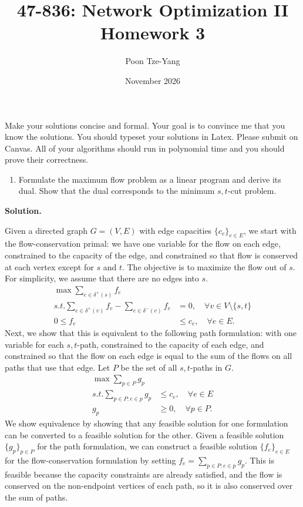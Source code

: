 \documentclass[11pt,letterpaper]{article}
\title{47-836: Network Optimization II \\ Homework 3}
\author{Poon Tze-Yang}
\date{November 2026}
\theoremstyle{definition}
\newcommand{\solution}{\medskip\noindent\textbf{Solution.}\par\medskip}
\begin{document}
\maketitle

Make your solutions concise and formal. Your goal is to convince me that you know the solutions. You should typeset your solutions in Latex. Please submit on Canvas. All of your algorithms should run in polynomial time and you should prove their correctness.

\begin{enumerate}[series=q]
\item Formulate the maximum flow problem as a linear program and derive its dual. Show that the dual corresponds to the minimum $s,t$-cut problem.
\end{enumerate}

\solution

Given a directed graph $G=(V,E)$ with edge capacities $\{c_e\}_{e \in E}$, we start with the flow-conservation primal: we have one variable for the flow on each edge, constrained to the capacity of the edge, and constrained so that flow is conserved at each vertex except for $s$ and $t$.
The objective is to maximize the flow out of $s$.
For simplicity, we assume that there are no edges into $s$.
\begin{align*}
    \max \sum_{e\in \delta^+(s)} f_e \\
    s.t. \sum_{e\in\delta^+(v)} f_e - \sum_{e\in\delta^-(v)} f_e &= 0,\quad \forall v \in V\setminus\{s,t\} \\
    0 \leq f_e &\leq c_e,\quad \forall e \in E.
\end{align*}
Next, we show that this is equivalent to the following path formulation: with one variable for each $s,t$-path, constrained to the capacity of each edge, and constrained so that the flow on each edge is equal to the sum of the flows on all paths that use that edge.
Let $P$ be the set of all $s,t$-paths in $G$.
\begin{align*}
    \max \sum_{p\in P} g_p \\
    s.t. \sum_{p\in P: e\in p} g_p &\leq c_e,\quad \forall e \in E \\
    g_p &\geq 0,\quad \forall p \in P.
\end{align*}
We show equivalence by showing that any feasible solution for one formulation can be converted to a feasible solution for the other.
Given a feasible solution $\{g_p\}_{p\in P}$ for the path formulation, we can construct a feasible solution $\{f_e\}_{e\in E}$ for the flow-conservation formulation by setting $f_e = \sum_{p\in P: e\in p} g_p$.
This is feasible because the capacity constraints are already satisfied, and the flow is conserved on the non-endpoint vertices of each path, so it is also conserved over the sum of paths.
\end{document}
